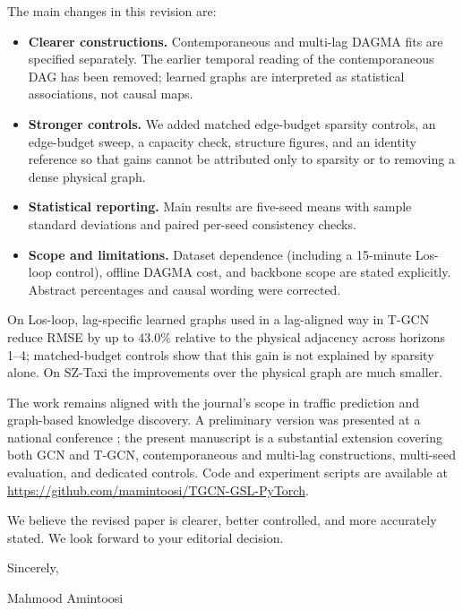 \documentclass[10pt]{article}
\begin{document}
The main changes in this revision are:
\begin{itemize}
    \item \textbf{Clearer constructions.} Contemporaneous and multi-lag DAGMA fits are specified separately. The earlier temporal reading of the contemporaneous DAG has been removed; learned graphs are interpreted as statistical associations, not causal maps.
    \item \textbf{Stronger controls.} We added matched edge-budget sparsity controls, an edge-budget sweep, a capacity check, structure figures, and an identity reference so that gains cannot be attributed only to sparsity or to removing a dense physical graph.
    \item \textbf{Statistical reporting.} Main results are five-seed means with sample standard deviations and paired per-seed consistency checks.
    \item \textbf{Scope and limitations.} Dataset dependence (including a 15-minute Los-loop control), offline DAGMA cost, and backbone scope are stated explicitly. Abstract percentages and causal wording were corrected.
\end{itemize}

On Los-loop, lag-specific learned graphs used in a lag-aligned way in T-GCN reduce RMSE by up to $43.0\%$ relative to the physical adjacency across horizons 1--4; matched-budget controls show that this gain is not explained by sparsity alone. On SZ-Taxi the improvements over the physical graph are much smaller.

The work remains aligned with the journal's scope in traffic prediction and graph-based knowledge discovery. A preliminary version was presented at a national conference \citep{Amintoosi1403aimc55-GSL}; the present manuscript is a substantial extension covering both GCN and T-GCN, contemporaneous and multi-lag constructions, multi-seed evaluation, and dedicated controls. Code and experiment scripts are available at \url{https://github.com/mamintoosi/TGCN-GSL-PyTorch}.

We believe the revised paper is clearer, better controlled, and more accurately stated. We look forward to your editorial decision.

\bigskip %

Sincerely,

\bigskip

Mahmood Amintoosi



\end{document}

